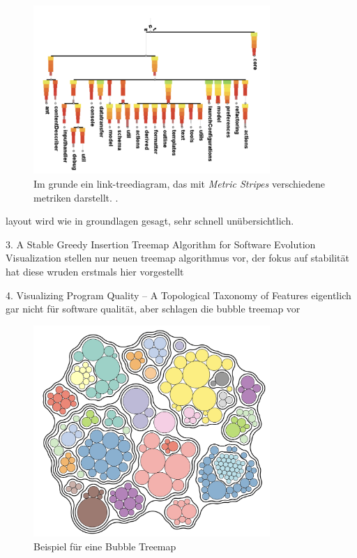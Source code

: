 \begin{figure}
    \centering
    \includegraphics[width=0.8\textwidth]{images/literatur/vishierarchy.png}
    \caption{Im grunde ein link-treediagram, das mit \textit{Metric Stripes} verschiedene metriken darstellt. \cite[740]{visSoftwareMetricsBook}.}
    \label{fig:visHierarchy}
\end{figure}

layout wird wie in groundlagen gesagt, sehr schnell unübersichtlich.

3. A Stable Greedy Insertion Treemap Algorithm for Software Evolution Visualization \cite{stableGreedyInsertion}
stellen nur neuen treemap algorithmus vor, der fokus auf stabilität hat
diese wruden erstmals hier vorgestellt \cite{Goertler2017BubbleTreemapsUncertainty}

4. Visualizing Program Quality – A Topological Taxonomy of Features  \cite{visualizingProgramQuality}
eigentlich gar nicht für software qualität, aber schlagen die bubble treemap vor

\begin{figure}
    \centering
    \includegraphics[width=0.8\textwidth]{images/literatur/bubbleTreemap.png}
    \caption{Beispiel für eine Bubble Treemap \cite[7]{Goertler2017BubbleTreemapsUncertainty}}
    \label{fig:bubbleTreemap}
\end{figure}

